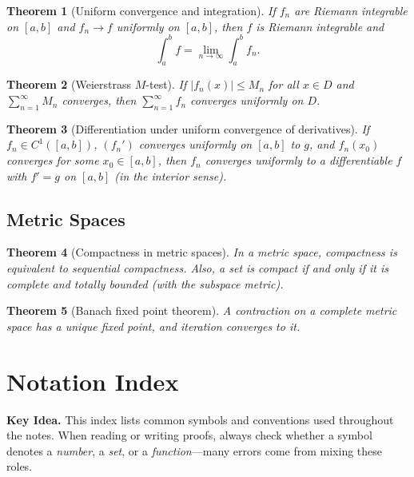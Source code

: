 \documentclass[12pt]{article}
\numberwithin{equation}{section}
\theoremstyle{plain}
\newtheorem{theorem}{Theorem}[section]
\theoremstyle{definition}
\theoremstyle{remark}
\newenvironment{keyidea}{\begin{tcolorbox}\textbf{Key Idea.}}{\end{tcolorbox}}
\begin{document}
\begin{theorem}[Uniform convergence and integration]
If $f_n$ are Riemann integrable on $[a,b]$ and $f_n\to f$ uniformly on $[a,b]$,
then $f$ is Riemann integrable and
\[
\int_a^b f = \lim_{n\to\infty}\int_a^b f_n.
\]
\end{theorem}

\begin{theorem}[Weierstrass $M$-test]
If $|f_n(x)|\le M_n$ for all $x\in D$ and $\sum_{n=1}^\infty M_n$ converges,
then $\sum_{n=1}^\infty f_n$ converges uniformly on $D$.
\end{theorem}

\begin{theorem}[Differentiation under uniform convergence of derivatives]
If $f_n\in C^1([a,b])$, $(f_n')$ converges uniformly on $[a,b]$ to $g$, and $f_n(x_0)$ converges for some $x_0\in[a,b]$,
then $f_n$ converges uniformly to a differentiable $f$ with $f'=g$ on $[a,b]$ (in the interior sense).
\end{theorem}

\subsection{Metric Spaces}

\begin{theorem}[Compactness in metric spaces]
In a metric space, compactness is equivalent to sequential compactness.
Also, a set is compact if and only if it is complete and totally bounded (with the subspace metric).
\end{theorem}

\begin{theorem}[Banach fixed point theorem]
A contraction on a complete metric space has a unique fixed point, and iteration converges to it.
\end{theorem}

\newpage

\section{Notation Index}

\begin{keyidea}
This index lists common symbols and conventions used throughout the notes.
When reading or writing proofs, always check whether a symbol denotes a \emph{number}, a \emph{set}, or a \emph{function}---many errors come from mixing these roles.
\end{keyidea}
\end{document}
